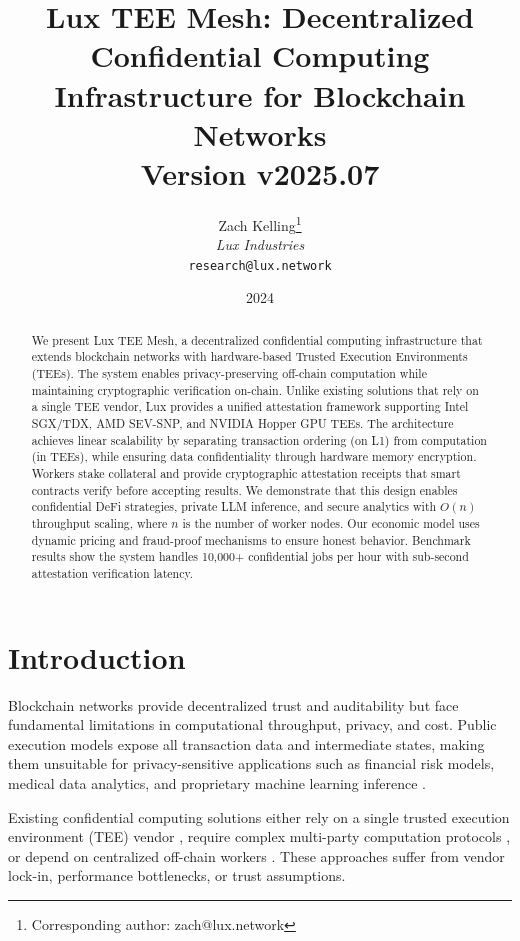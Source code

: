 \documentclass[11pt,letterpaper]{article}
\title{\textbf{Lux TEE Mesh: Decentralized Confidential Computing Infrastructure for Blockchain Networks}\\
\large Version v2025.07}
\author{
Zach Kelling\thanks{Corresponding author: zach@lux.network}\\
\textit{Lux Industries}\\
\texttt{research@lux.network}
}
\date{2024}
\begin{document}
\luxcoverpage
\maketitle

\begin{abstract}
We present Lux TEE Mesh, a decentralized confidential computing infrastructure that extends blockchain networks with hardware-based Trusted Execution Environments (TEEs). The system enables privacy-preserving off-chain computation while maintaining cryptographic verification on-chain. Unlike existing solutions that rely on a single TEE vendor, Lux provides a unified attestation framework supporting Intel SGX/TDX, AMD SEV-SNP, and NVIDIA Hopper GPU TEEs. The architecture achieves linear scalability by separating transaction ordering (on L1) from computation (in TEEs), while ensuring data confidentiality through hardware memory encryption. Workers stake collateral and provide cryptographic attestation receipts that smart contracts verify before accepting results. We demonstrate that this design enables confidential DeFi strategies, private LLM inference, and secure analytics with $O(n)$ throughput scaling, where $n$ is the number of worker nodes. Our economic model uses dynamic pricing and fraud-proof mechanisms to ensure honest behavior. Benchmark results show the system handles 10,000+ confidential jobs per hour with sub-second attestation verification latency.
\end{abstract}

\section{Introduction}

Blockchain networks provide decentralized trust and auditability but face fundamental limitations in computational throughput, privacy, and cost. Public execution models expose all transaction data and intermediate states, making them unsuitable for privacy-sensitive applications such as financial risk models, medical data analytics, and proprietary machine learning inference \cite{ethereum-privacy,lux-appchains}.

Existing confidential computing solutions either rely on a single trusted execution environment (TEE) vendor \cite{secret-network,oasis-sapphire}, require complex multi-party computation protocols \cite{mpc-overview}, or depend on centralized off-chain workers \cite{iexec,truebit}. These approaches suffer from vendor lock-in, performance bottlenecks, or trust assumptions.
\end{document}
